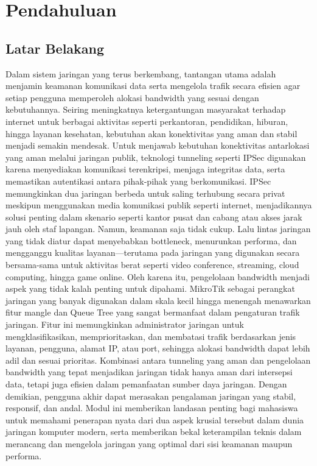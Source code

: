 \section{Pendahuluan}
\subsection{Latar Belakang}
Dalam sistem jaringan yang terus berkembang, tantangan utama adalah menjamin keamanan komunikasi data serta mengelola trafik secara efisien agar setiap pengguna memperoleh alokasi bandwidth yang sesuai dengan kebutuhannya. Seiring meningkatnya ketergantungan masyarakat terhadap internet untuk berbagai aktivitas seperti perkantoran, pendidikan, hiburan, hingga layanan kesehatan, kebutuhan akan konektivitas yang aman dan stabil menjadi semakin mendesak. Untuk menjawab kebutuhan konektivitas antarlokasi yang aman melalui jaringan publik, teknologi tunneling seperti IPSec digunakan karena menyediakan komunikasi terenkripsi, menjaga integritas data, serta memastikan autentikasi antara pihak-pihak yang berkomunikasi. IPSec memungkinkan dua jaringan berbeda untuk saling terhubung secara privat meskipun menggunakan media komunikasi publik seperti internet, menjadikannya solusi penting dalam skenario seperti kantor pusat dan cabang atau akses jarak jauh oleh staf lapangan. Namun, keamanan saja tidak cukup. Lalu lintas jaringan yang tidak diatur dapat menyebabkan bottleneck, menurunkan performa, dan mengganggu kualitas layanan—terutama pada jaringan yang digunakan secara bersama-sama untuk aktivitas berat seperti video conference, streaming, cloud computing, hingga game online. Oleh karena itu, pengelolaan bandwidth menjadi aspek yang tidak kalah penting untuk dipahami. MikroTik sebagai perangkat jaringan yang banyak digunakan dalam skala kecil hingga menengah menawarkan fitur mangle dan Queue Tree yang sangat bermanfaat dalam pengaturan trafik jaringan. Fitur ini memungkinkan administrator jaringan untuk mengklasifikasikan, memprioritaskan, dan membatasi trafik berdasarkan jenis layanan, pengguna, alamat IP, atau port, sehingga alokasi bandwidth dapat lebih adil dan sesuai prioritas. Kombinasi antara tunneling yang aman dan pengelolaan bandwidth yang tepat menjadikan jaringan tidak hanya aman dari intersepsi data, tetapi juga efisien dalam pemanfaatan sumber daya jaringan. Dengan demikian, pengguna akhir dapat merasakan pengalaman jaringan yang stabil, responsif, dan andal. Modul ini memberikan landasan penting bagi mahasiswa untuk memahami penerapan nyata dari dua aspek krusial tersebut dalam dunia jaringan komputer modern, serta memberikan bekal keterampilan teknis dalam merancang dan mengelola jaringan yang optimal dari sisi keamanan maupun performa.
